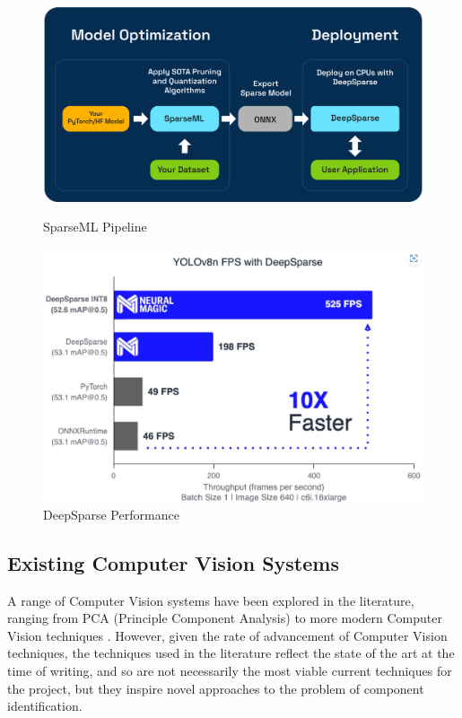 \begin{figure}[t]
  \begin{minipage}[t]{0.45\textwidth}
    \centering
    \includegraphics[width=\textwidth]{imgs/articles/sparseml-workflow.png}
    \caption{SparseML Pipeline \cite{sparseml}}
  \end{minipage}
  \hfill
  \begin{minipage}[t]{0.45\textwidth}
      \centering
      \includegraphics[width=\textwidth]{imgs/articles/yoloperf.jpg}
      \caption{DeepSparse Performance \cite{neuralmagic}}
      \end{minipage}
\end{figure}

\subsection{Existing Computer Vision Systems}
A range of Computer Vision systems have been explored in the literature, ranging from PCA (Principle Component Analysis) \citet{Dhenge2013MechanicalNS} to more modern Computer Vision techniques \citet{Xu2020,s22239079}. However, given the rate of advancement of Computer Vision
techniques, the techniques used in the literature reflect the state of the art at the time of writing, and so are not necessarily the most viable current techniques for the project, but they inspire novel approaches to the problem of component identification.

